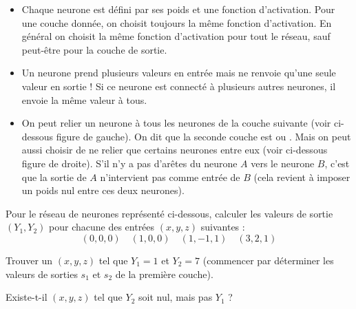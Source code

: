 	\begin{itemize}
		\item Chaque neurone est défini par ses poids et une fonction d'activation. Pour une couche donnée, on choisit toujours la même fonction d'activation. En général on choisit la même fonction d'activation pour tout le réseau, sauf peut-être pour la couche de sortie.
		
		\item Un neurone prend plusieurs valeurs en entrée mais ne renvoie qu'une seule valeur en sortie ! Si ce neurone est connecté à plusieurs autres neurones, il envoie la même valeur à tous.
		
		
		\item On peut relier un neurone à tous les neurones de la couche suivante (voir ci-dessous figure de gauche). On dit que la seconde couche  est   ou  . Mais on peut aussi choisir de ne relier que certains neurones entre eux (voir ci-dessous figure de droite). S'il n'y a pas d'arêtes du neurone $A$ vers le neurone $B$, c'est que la sortie de $A$ n'intervient pas comme entrée de $B$ (cela revient à imposer un poids nul entre ces deux neurones).
		
		
		
		
	\end{itemize}

\begin{exemple}{}{}
	Pour le réseau de neurones représenté ci-dessous, calculer les valeurs de sortie $(Y_1,Y_2)$ pour chacune des entrées $(x,y,z)$ suivantes :
	$$(0,0,0) \quad (1,0,0) \quad (1,-1,1) \quad (3,2,1)$$
	
	
	
	
	Trouver un $(x,y,z)$ tel que $Y_1=1$ et $Y_2=7$ (commencer par déterminer les valeurs de sorties $s_1$ et $s_2$ de la première couche).
	
	Existe-t-il $(x,y,z)$ tel que $Y_2$ soit nul, mais pas $Y_1$ ?
\end{exemple}

